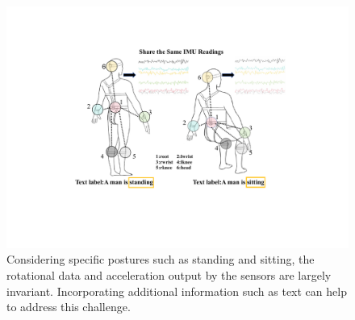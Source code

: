 \documentclass[letterpaper]{article} %
\begin{document}
\begin{figure}[t]
\centering
\includegraphics[width=1\columnwidth]{Same_Readings.pdf}
\caption{Considering specific postures such as standing and sitting, the rotational data and acceleration output by the sensors are largely invariant. Incorporating additional information such as text can help to address this challenge.}
\label{fig1}
\end{figure}
\end{document}
